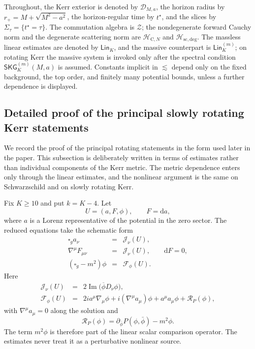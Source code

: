 \documentclass[11pt]{article}
\numberwithin{equation}{section}
\theoremstyle{plain}
\theoremstyle{definition}
\theoremstyle{remark}
\newcommand{\D}{\mathcal{D}}
\newcommand{\dd}{\mathrm{d}}
\newcommand{\Lin}{\mathsf{Lin}}
\newcommand{\SKG}{\mathsf{SKG}}
\newcommand{\Hcauchy}{\mathcal H_{\mathrm{C},N}}
\newcommand{\Hscatt}{\mathcal H_{\mathrm{sc,deg}}}
\begin{document}
Throughout, the Kerr exterior is denoted by \(\D_{M,a}\), the horizon radius by \(r_+=M+\sqrt{M^2-a^2}\), the horizon-regular time by \(t^\star\), and the slices by \(\Sigma_\tau=\{t^\star=\tau\}\). The commutation algebra is \(\mathcal Z\); the nondegenerate forward Cauchy norm and the degenerate scattering norm are \(\Hcauchy\) and \(\Hscatt\). The massless linear estimates are denoted by \(\Lin_K\), and the massive counterpart is \(\Lin_K^{(m)}\); on rotating Kerr the massive system is invoked only after the spectral condition \(\SKG^{(m)}_K(M,a)\) is assumed. Constants implicit in \(\lesssim\) depend only on the fixed background, the top order, and finitely many potential bounds, unless a further dependence is displayed.



\subsection{Detailed proof of the principal slowly rotating Kerr statements}\label{subsec:detailed-main-proof}

We record the proof of the principal rotating statements in the form used later in the paper.  This subsection is deliberately written in terms of estimates rather than individual components of the Kerr metric.  The metric dependence enters only through the linear estimates, and the nonlinear argument is the same on Schwarzschild and on slowly rotating Kerr.

Fix \(K\ge10\) and put \(k=K-4\).  Let
\begin{equation}\label{eq:detailed-U-def}
 U=(a,F,\phi),\qquad F=\dd a,
\end{equation}
where \(a\) is a Lorenz representative of the potential in the zero sector.  The reduced equations take the schematic form
\begin{eqnarray}
 \square_g a_\nu &=& \mathcal J_\nu(U),
 \label{eq:detailed-reduced-a}\\
 \nabla^\mu F_{\mu\nu}&=&\mathcal J_\nu(U),
 \qquad \dd F=0,
 \label{eq:detailed-reduced-F}\\
 (\square_g-m^2)\phi&=&\mathcal F_\phi(U).
 \label{eq:detailed-reduced-phi}
\end{eqnarray}
Here
\begin{eqnarray}
 \mathcal J_\nu(U)
 &=&2\operatorname{Im}\bigl(\overline\phi D_\nu\phi\bigr),
 \label{eq:detailed-current}\\
 \mathcal F_\phi(U)
 &=&2ia^\mu\nabla_\mu\phi+i(\nabla^\mu a_\mu)\phi+a^\mu a_\mu\phi+\mathcal R_P(\phi),
 \label{eq:detailed-scalar-source}
\end{eqnarray}
with \(\nabla^\mu a_\mu=0\) along the solution and
\begin{equation}\label{eq:detailed-RP}
 \mathcal R_P(\phi)=\partial_{\bar\phi}P(\phi,\bar\phi)-m^2\phi.
\end{equation}
The term \(m^2\phi\) is therefore part of the linear scalar comparison operator.  The estimates never treat it as a perturbative nonlinear source.
\end{document}

